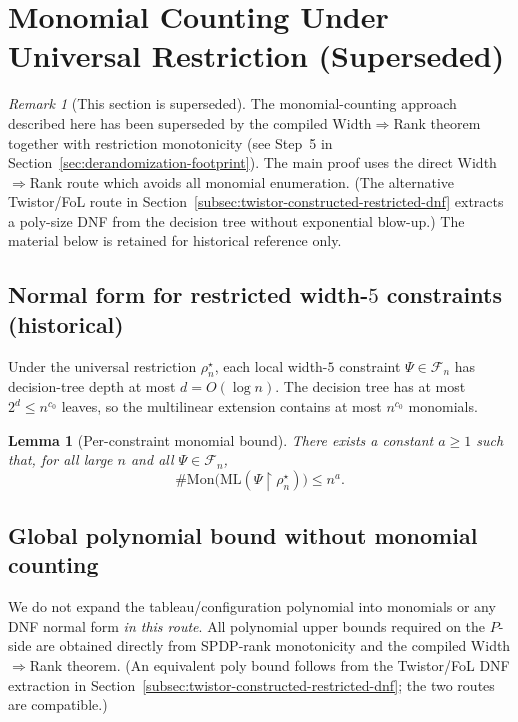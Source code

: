 \documentclass[12pt]{article}
\newtheorem{lemma}[theorem]{Lemma}
\theoremstyle{definition}
\theoremstyle{definition}
\theoremstyle{remark}
\newtheorem{remark}{Remark}
\theoremstyle{remark}
\begin{document}
\section{Monomial Counting Under Universal Restriction (Superseded)}
\label{sec:monomial-counting}

\begin{remark}[This section is superseded]
The monomial-counting approach described here has been superseded by the
compiled Width$\Rightarrow$Rank theorem together with restriction monotonicity
(see Step~5 in Section~\ref{sec:derandomization-footprint}). The main proof
uses the direct Width$\Rightarrow$Rank route which avoids all monomial enumeration.
(The alternative Twistor/FoL route in Section~\ref{subsec:twistor-constructed-restricted-dnf}
extracts a poly-size DNF from the decision tree without exponential blow-up.)
The material below is retained for historical reference only.
\end{remark}

\subsection{Normal form for restricted width-$5$ constraints (historical)}
\label{subsec:dnf-normal-form}

Under the universal restriction $\rho^\star_n$, each local width-$5$
constraint $\Psi\in\mathcal{F}_n$ has decision-tree depth at most $d=O(\log n)$.
The decision tree has at most $2^d\le n^{c_0}$ leaves, so the multilinear
extension contains at most $n^{c_0}$ monomials.

\begin{lemma}[Per-constraint monomial bound]
\label{lem:per-constraint-monomials}
There exists a constant $a\ge 1$ such that, for all large $n$ and all
$\Psi\in\mathcal{F}_n$,
\[
\#\mathrm{Mon}\big(\mathrm{ML}(\Psi\!\upharpoonright\rho^\star_n)\big)\le n^a.
\]
\end{lemma}

\subsection{Global polynomial bound without monomial counting}
\label{subsec:global-bound-without-monomials}

We do not expand the tableau/configuration polynomial into monomials or any DNF normal
form \emph{in this route}.  All polynomial upper bounds required on the $P$-side are
obtained directly from SPDP-rank monotonicity and the compiled Width$\Rightarrow$Rank theorem.
(An equivalent poly bound follows from the Twistor/FoL DNF extraction in
Section~\ref{subsec:twistor-constructed-restricted-dnf}; the two routes are compatible.)
\end{document}
